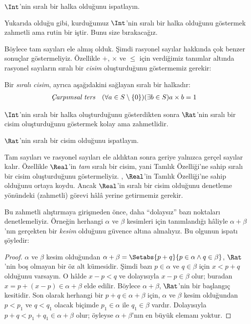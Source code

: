 \documentclass[../../../include/open-logic-section]{subfiles}
\begin{document}
\begin{prob}
$\Int$'nin sıralı bir halka olduğunu ispatlayın.
\end{prob}

Yukarıda olduğu gibi, kurduğumuz $\Int$'nin sıralı bir halka olduğunu
göstermek zahmetli ama rutin bir iştir. Bunu size bırakacağız.

Böylece tam sayıları ele almış olduk. Şimdi rasyonel sayılar hakkında çok
benzer sonuçlar göstermeliyiz. Özellikle $+$, $\times$ ve $\leq$ için
verdiğimiz tanımlar altında rasyonel sayıların sıralı bir \emph{cisim}
oluşturduğunu göstermemiz gerekir:
\begin{defn}
Bir \emph{sıralı cisim}, ayrıca aşağıdakini sağlayan sıralı bir halkadır:
\begin{align*}
	\emph{Çarpımsal ters}& & (\forall a \in S \setminus \{0\})(\exists b \in S) a\times b& = 1
\end{align*}
\end{defn}

$\Int$'nin sıralı bir halka oluşturduğunu gösterdikten sonra $\Rat$'nin
sıralı bir cisim oluşturduğunu göstermek kolay ama zahmetlidir.

\begin{prob}
$\Rat$'nin sıralı bir cisim olduğunu ispatlayın.
\end{prob}

Tam sayıları ve rasyonel sayıları ele aldıktan sonra geriye yalnızca gerçel
sayılar kalır. Özellikle $\Real$'in \emph{tam} sıralı bir cisim, yani Tamlık
Özelliği'ne sahip sıralı bir cisim oluşturduğunu göstermeliyiz.
, $\Real$'in Tamlık Özelliği'ne sahip olduğunu
ortaya koydu. Ancak $\Real$'in sıralı bir cisim olduğunu denetleme yönündeki
(zahmetli) görevi hâlâ yerine getirmemiz gerekir.

Bu zahmetli alıştırmaya girişmeden önce, daha “dolaysız” bazı noktaları
denetlemeliyiz. Örneğin herhangi $\alpha$ ve $\beta$ kesimleri için
tanımlandığı hâliyle $\alpha + \beta$'nın gerçekten bir \emph{kesim} olduğunu
güvence altına almalıyız. Bu olgunun ispatı şöyledir:

\begin{proof}	
$\alpha$ ve $\beta$ kesim olduğundan
$\alpha + \beta = \Setabs{p + q}{p \in \alpha \land q \in \beta}$,
$\Rat$'nin boş olmayan bir öz alt kümesidir. Şimdi bazı $p \in \alpha$ ve
$q \in \beta$ için $x < p + q$ olduğunu varsayın. O hâlde
$x - p < q$ ve dolayısıyla $x - p \in \beta$ olur; buradan
$x = p + (x - p) \in \alpha + \beta$ elde edilir. Böylece
$\alpha + \beta$, $\Rat$'nin bir başlangıç kesitidir. Son olarak herhangi
bir $p + q \in \alpha + \beta$ için, $\alpha$ ve $\beta$ kesim olduğundan
$p < p_1$ ve $q < q_1$ olacak biçimde $p_1 \in \alpha$ ile
$q_1 \in \beta$ vardır. Dolayısıyla
$p + q < p_1 + q_1 \in \alpha + \beta$ olur; öyleyse
$\alpha + \beta$'nın en büyük elemanı yoktur.
\end{proof}
\end{document}

